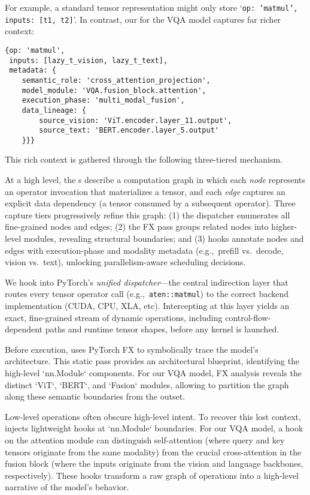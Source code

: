 For example, a standard tensor representation might only store `\texttt{{op: 'matmul', inputs: [t1, t2]}}'.
In contrast, our \lazytensor for the VQA model captures far richer context:

{\small\begin{verbatim}
{op: 'matmul',
 inputs: [lazy_t_vision, lazy_t_text],
 metadata: {
    semantic_role: 'cross_attention_projection',
    model_module: 'VQA.fusion_block.attention',
    execution_phase: 'multi_modal_fusion',
    data_lineage: {
        source_vision: 'ViT.encoder.layer_11.output',
        source_text: 'BERT.encoder.layer_5.output'
    }}}
\end{verbatim}
}

\noindent
This rich context is gathered through the following three-tiered mechanism.

At a high level, the \lazytensor{}s describe a computation graph in which each \emph{node} represents an operator invocation that materializes a tensor, 
and each \emph{edge} captures an explicit data dependency (a tensor consumed by a subsequent operator). 
Three capture tiers progressively refine this graph: 
(1) the dispatcher enumerates all fine-grained nodes and edges; 
(2) the FX pass groups related nodes into higher-level modules, revealing structural boundaries; and 
(3) hooks annotate nodes and edges with execution-phase and modality metadata (e.g.,~prefill vs.~decode, vision vs.~text), unlocking parallelism-aware scheduling decisions.

     We hook into 
    PyTorch's \emph{unified dispatcher}---the central indirection layer that routes every tensor operator call (e.g.,\ \texttt{aten::matmul}) to the correct backend implementation (CUDA, CPU, XLA, etc). 
    Intercepting at this layer yields an exact, fine-grained stream of dynamic operations, including control-flow-dependent paths and runtime tensor shapes, before any kernel is launched.

     Before execution, \sys uses PyTorch FX to symbolically trace the model's architecture. This static pass provides an architectural blueprint, identifying the high-level `nn.Module` components. For our VQA model, FX analysis reveals the distinct `ViT`, `BERT`, and `Fusion` modules, allowing \sys to partition the graph along these semantic boundaries from the outset.

     Low-level operations often obscure high-level intent. To recover this lost context, \sys injects lightweight hooks at `nn.Module` boundaries. For our VQA model, a hook on the attention module can distinguish self-attention (where query and key tensors originate from the same modality) from the crucial cross-attention in the fusion block (where the inputs originate from the vision and language backbones, respectively). These hooks transform a raw graph of operations into a high-level narrative of the model's behavior.

